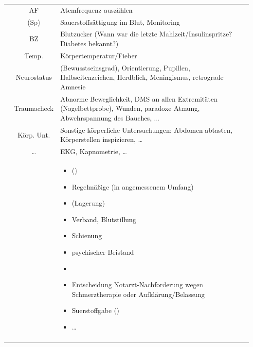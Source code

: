 {\begin{minipage}{\linewidth}
{\begin{tabulary}{\linewidth}[H]{lCL}
{}
 &
{\sffamily AF}
 &
Atemfrequenz auszählen
\\\addlinespace
 &
({\sffamily Sp})
 &
Sauerstoffsättigung im Blut, Monitoring
\\\addlinespace
 &
{\sffamily  BZ}
 &
Blutzucker {\tiny(Wann war die letzte
Mahlzeit/Insulinspritze? Diabetes bekannt?)}
\\\addlinespace
 &
{\sffamily Temp.}
 &
Körpertemperatur/Fieber
\\\addlinespace
 &
 {\sffamily\small Neuro\-status}
 &
(Bewusstseinsgrad), Orientierung,
Pupillen, Halbseitenzeichen, Herdblick, Meningismus,
retrograde Amnesie
\\\addlinespace
 &
{\sffamily\small Trauma\-check}
 &
Abnorme Beweglichkeit, DMS an allen
Extremitäten (Nagelbettprobe), Wunden, paradoxe Atmung,
Abwehrspannung des Bauches, ...
\\\addlinespace
 &
{\sffamily\small Körp. Unt.}
&
Sonstige körperliche Untersuchungen: Abdomen abtasten,
Körperstellen inspizieren, \ldots
\\\addlinespace
 &
{\sffamily\small \ldots}
&
EKG, Kapnometrie, \ldots
\\\addlinespace\midrule\addlinespace
{}
&
&
\begin{minipage}{\linewidth}
\begin{itemize}
  \item {}
  ()
  \item Regelmäßige  {\tiny(in angemessenem Umfang)}
  \item (Lagerung)
  \item Verband, Blutstillung
  \item Schienung
  \item psychischer Beistand
  \item {}
  \item Entscheidung Notarzt-Nachforderung wegen
  Schmerztherapie oder Aufklärung/Belassung
  \item Suerstoffgabe ()
  \item \ldots
\end{itemize}
\end{minipage}
\\\addlinespace\midrule\addlinespace
{}
&
&
\begin{minipage}{\linewidth}

\end{minipage}
\end{tabulary}}
\end{minipage}}
